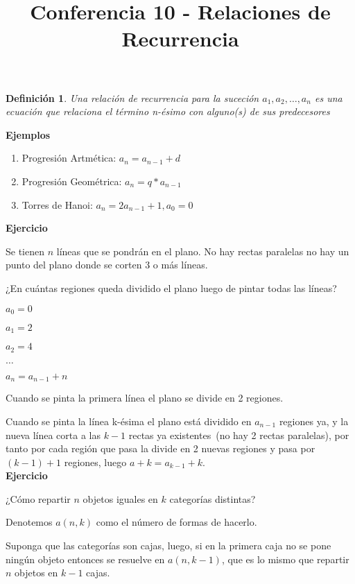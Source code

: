 \documentclass[a4paper,12pt]{report}
\title{Conferencia 10 - Relaciones de Recurrencia}
\author{}
\newtheorem*{dfn}{Definición}
\begin{document}
\maketitle



\begin{dfn}
 Una relación de recurrencia para la suceción $a_1, a_2,\dots, a_n$ es una ecuación que relaciona el término n-ésimo con alguno(s) de sus predecesores
\end{dfn}

\textbf{Ejemplos}

\begin{enumerate}
 \item Progresión Artmética: $a_n=a_{n-1}+d$
 \item Progresión Geométrica: $a_n=q*a_{n-1}$
 \item Torres de Hanoi: $a_n = 2a_{n-1}+1,a_0=0$
\end{enumerate}

\textbf{Ejercicio}

Se tienen $n$ líneas que se pondrán en el plano. No hay rectas paralelas no
hay un punto del plano donde se corten 3 o más líneas.

¿En cuántas regiones queda dividido el plano luego de pintar todas las líneas?

$a_0=0$

$a_1=2$

$a_2=4$

$\dots$

$a_n=a_{n-1}+n$

Cuando se pinta la primera línea el plano se divide en 2 regiones.

Cuando se pinta la línea k-ésima el plano está dividido en $a_{n-1}$ regiones ya, y la nueva línea corta a las $k-1$ rectas ya existentes~(no hay 2 rectas paralelas), por tanto por cada región que pasa la divide en 2 nuevas regiones y pasa por $(k-1)+1$ regiones, luego $a+k=a_{k-1}+k$.\\


\textbf{Ejercicio}

¿Cómo repartir $n$ objetos iguales en $k$ categorías distintas?

Denotemos $a(n,k)$ como el número de formas de hacerlo.

Suponga que las categorías son cajas, luego, si en la primera caja no se pone ningún objeto entonces se resuelve en $a(n,k-1)$, que es lo mismo que repartir $n$ objetos en $k-1$ cajas.
\end{document}
